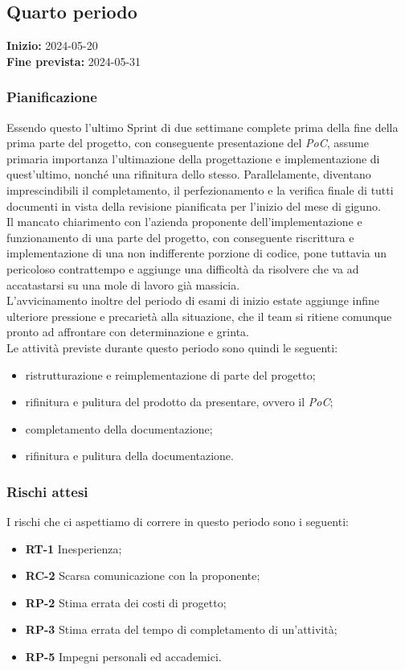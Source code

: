 \subsection{Quarto periodo} \label{sec:4_rtb}
\textbf{Inizio:} 2024-05-20\\
\textbf{Fine prevista:} 2024-05-31
\subsubsection{Pianificazione}
Essendo questo l'ultimo Sprint di due settimane complete prima della fine della prima parte del progetto,
con conseguente presentazione del \textit{PoC}, assume primaria importanza l'ultimazione della progettazione
e implementazione di quest'ultimo, nonché una rifinitura dello stesso. Parallelamente, diventano imprescindibili
il completamento, il perfezionamento e la verifica finale di tutti documenti in vista della revisione pianificata
per l'inizio del mese di giguno. \\
Il mancato chiarimento con l'azienda proponente dell'implementazione e funzionamento di una parte del progetto,
con conseguente riscrittura e implementazione di una non indifferente porzione di codice, pone tuttavia un pericoloso
contrattempo e aggiunge una difficoltà da risolvere che va ad accatastarsi su una mole di lavoro già massicia. \\
L'avvicinamento inoltre del periodo di esami di inizio estate aggiunge infine ulteriore pressione e precarietà
alla situazione, che il team si ritiene comunque pronto ad affrontare con determinazione e grinta.\\
Le attività previste durante questo periodo sono quindi le seguenti:
\begin{itemize}
\setlength{\itemsep}{0}
    \item ristrutturazione e reimplementazione di parte del progetto;
    \item rifinitura e pulitura del prodotto da presentare, ovvero il \textit{PoC};
    \item completamento della documentazione;
    \item rifinitura e pulitura della documentazione.
\end{itemize}
\subsubsection{Rischi attesi}
I rischi che ci aspettiamo di correre in questo periodo sono i seguenti: 
\begin{itemize}
\setlength{\itemsep}{0}
    \item \textbf{RT-1} Inesperienza;  
    \item \textbf{RC-2} Scarsa comunicazione con la proponente;
    \item \textbf{RP-2} Stima errata dei costi di progetto;
    \item \textbf{RP-3} Stima errata del tempo di completamento di un'attività;
    \item \textbf{RP-5} Impegni personali ed accademici.
\end{itemize}
